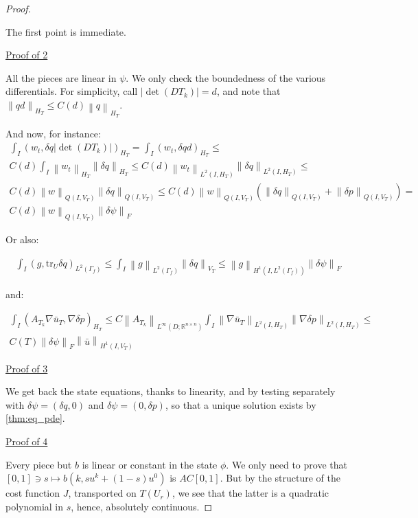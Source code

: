\documentclass[english,a4paper,10pt,oneside]{scrbook}	%
\theoremstyle{break}
\newenvironment{mproof}[1][\proofname]{%
  \begin{proof}[#1]$ $\par\nobreak\ignorespaces
}{%
  \end{proof}
}
\renewcommand*{\proofname}{Proof}
\theoremstyle{remark}
\newcommand{\mR}{\mathbb{R}}
\newcommand{\norm}[1]{\left\lVert#1\right\rVert}
\newcommand{\tr}{\text{tr}}
\begin{document}
\begin{mproof}

The first point is immediate.

\underline{Proof of 2}

All the pieces are linear in $\psi$. We only check the boundedness of the various differentials. For simplicity, call $|\det(DT_k)|=d$, and note that   $\norm{qd}_{H_T}\leq C(d)\norm{q}_{H_T}$.

And now, for instance:
\begin{align*}
\int_I ( w_t , \delta q |\det(DT_k)|)_{H_T} = \int_I ( w_t , \delta q d )_{H_T}\leq\\ C(d) \int_I \norm{w_t}_{H_T}\norm{\delta q}_{H_T}\leq C(d) \norm{w_t}_{L^2(I,H_T)}\norm{\delta q}_{L^2(I,H_T)}\leq\\C(d) \norm{w}_{Q(I,V_T)}\norm{\delta q}_{Q(I,V_T)}\leq
C(d) \norm{w}_{Q(I,V_T)}(\norm{\delta q}_{Q(I,V_T)}+\norm{\delta p}_{Q(I,V_T)}) =\\ C(d) \norm{w}_{Q(I,V_T)}\norm{\delta\psi}_F
\end{align*}

Or also:

\begin{align*}
\int_I(g,\tr_{U} \delta q)_{L^2(\Gamma_f)}\leq \int_I \norm{g}_{L^2(\Gamma_f)}\norm{\delta q}_{V_T}\leq \norm{g}_{H^1(I,L^2(\Gamma_f))}\norm{\delta\psi}_F
\end{align*}

and:

\begin{align*}
\int_I (A_{T_k} \nabla \bar{u}_T, \nabla\delta p)_{H_T}\leq C\norm{A_{T_k}}_{L^\infty(D;\mR^{n\times n})}\int_I \norm{\nabla \bar{u}_T}_{L^2(I,H_T)}\norm{\nabla\delta p}_{L^2(I,H_T)}\leq\\ C(T) \norm{\delta\psi}_F \norm{\bar{u}}_{H^1(I,V_T)}
\end{align*}

\underline{Proof of 3}

We get back the state equations, thanks to linearity, and by testing separately with $\delta \psi =(\delta q, 0)$ and $\delta \psi = (0,\delta p)$, so that a unique solution exists by \cref{thm:eq_pde}.

\underline{Proof of 4}

Every piece but $b$ is linear or constant in the state $\phi$. We only need to prove that $[0,1]\ni s \mapsto b(k, su^k + (1-s)u^0)$ is $AC[0,1]$. But by the structure of the cost function $J$, transported on $T(U_r)$, we see that the latter is a quadratic polynomial in $s$, hence, absolutely continuous.


\end{mproof}
\end{document}
